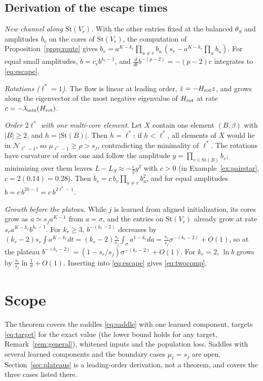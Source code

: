 \documentclass[11pt]{article}
\theoremstyle{definition}
\newcommand{\St}{\mathrm{St}}
\begin{document}
\subsection{Derivation of the escape times}\label{sec:escape-deriv}

\emph{New channel along $\St(V_r)$.} With the other entries fixed at the balanced $\theta_S$ and amplitudes $b_v$ on the cores of
$\St(V_r)$, the computation of Proposition~\ref{prop:route} gives
$\dot b_v=a^{K-k_r}\prod_{u\ne v}b_u\,(s_r-a^{K-k_r}\prod_ub_u)$. For equal small amplitudes, $\dot b=c_rb^{k_r-1}$, and
$\frac{d}{dt}b^{-(p-2)}=-(p-2)c$ integrates to \eqref{eq:escape}.

\emph{Rotations ($\ell^*=1$).} The flow is linear at leading order, $\dot z=-H_{\rm rot}z$, and grows along the eigenvector of the
most negative eigenvalue of $H_{\rm rot}$ at rate $c=-\lambda_{\min}(H_{\rm rot})$.

\emph{Order $2\ell^*$ with one multi-core element.} Let $X$ contain one element $(B,\beta)$ with $\lvert B\rvert\ge2$, and $h=\lvert\St(B)\rvert$.
Then $h=\ell^*$: if $h<\ell^*$, all elements of $X$ would lie in $\mathcal N_{\ell^*-1}$, so $\mu_{\ell^*-1}\ge\rho>s_j$, contradicting the
minimality of $\ell^*$. The rotations have curvature of order one and follow the amplitude $y=\prod_{v\in\St(B)}b_v$; minimizing over
them leaves $L-L_S\approx-\frac c2y^2$ with $c>0$ (in Example~\ref{ex:pairstar}, $c=2(0.14)=0.28$). Then
$\dot b_v=c\,b_v\prod_{u\ne v}b_u^2$, and for equal amplitudes $\dot b=c\,b^{2h-1}=c\,b^{2\ell^*-1}$.

\emph{Growth before the plateau.} While $j$ is learned from aligned initialization, its cores grow as $\dot a\simeq s_ja^{K-1}$ from
$a=\sigma$, and the entries on $\St(V_r)$ already grow at rate $s_ra^{K-k_r}b^{k_r-1}$. For $k_r\ge3$, $b^{-(k_r-2)}$ decreases by
$(k_r-2)s_r\int a^{K-k_r}dt=(k_r-2)\frac{s_r}{s_j}\int_\sigma a^{1-k_r}da=\frac{s_r}{s_j}\sigma^{-(k_r-2)}+O(1)$, so at the plateau
$b^{-(k_r-2)}=(1-s_r/s_j)\sigma^{-(k_r-2)}+O(1)$. For $k_r=2$, $\ln b$ grows by $\frac{s_r}{s_j}\ln\frac1\sigma+O(1)$. Inserting into
\eqref{eq:escape} gives \eqref{eq:twocomp}.

\section{Scope}
The theorem covers the saddles \eqref{eq:saddle} with one learned component, targets \eqref{eq:target} for the exact value (the
lower bound holds for any target, Remark~\ref{rem:general}), whitened inputs and the population loss. Saddles with several
learned components and the boundary cases $\mu_\ell=s_j$ are open. Section~\ref{sec:plateaus} is a leading-order derivation, not a
theorem, and covers the three cases listed there.



\end{document}
